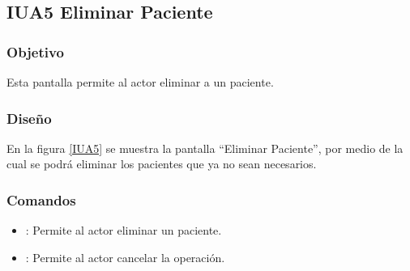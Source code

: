 \subsection{IUA5 Eliminar Paciente}
 
\subsubsection{Objetivo}

    Esta pantalla permite al actor eliminar a un paciente.

\subsubsection{Diseño}

    En la figura \ref{IUA5} se muestra la pantalla ``Eliminar Paciente'', por medio de la cual se podrá eliminar los pacientes que ya no sean necesarios. \\


\subsubsection{Comandos}
\begin{itemize}
    \item {}: Permite al actor eliminar un paciente.
    \item {}: Permite al actor cancelar la operación.
    
\end{itemize}

%
